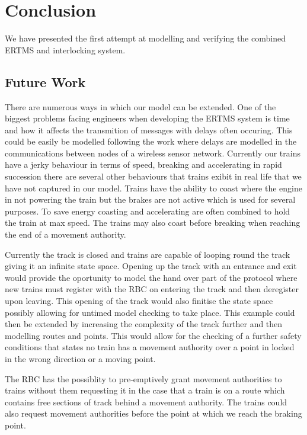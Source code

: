 \section{Conclusion}
 We have presented the first attempt at modelling and verifying the combined ERTMS and interlocking system.
\subsection*{Future Work}
There are numerous ways in which our model can be extended. One of the biggest problems facing engineers when developing the ERTMS system is time and how it affects the transmition of messages with delays often occuring. This could be easily be modelled following the work \cite{PO07} where delays are modelled in the communications between nodes of a wireless sensor network. Currently our trains have a jerky behaviour in terms of speed, breaking and accelerating in rapid succession there are several other behaviours that trains exibit in real life that we have not captured in our model. Trains have the ability to coast where the engine in not powering the train but the brakes are not active which is used for several purposes. To save energy coasting and accelerating are often combined to hold the train at max speed. The trains may also coast before breaking when reaching the end of a movement authority.

Currently the track is closed and trains are capable of looping round the track giving it an infinite state space. Opening up the track with an entrance and exit would provide the oportunity to model the hand over part of the protocol where new trains must register with the RBC on entering the track and then deregister upon leaving. This opening of the track would also finitise the state space possibly allowing for untimed model checking to take place. This example could then be extended by increasing the complexity of the track further and then modelling routes and points. This would allow for the checking of a further safety conditions that states no train has a movement authority over a point in locked in the wrong direction or a moving point.

The RBC has the possiblity to pre-emptively grant movement authorities to trains without them requesting it in the case that a train is on a route which contains free sections of track behind a movement authority.  The trains could also request movement authorities before the point at which we reach the braking point.